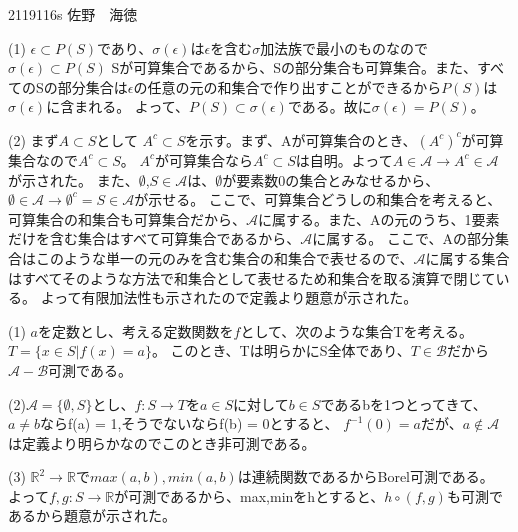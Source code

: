 \documentclass[11pt]{jsarticle}
\begin{document}
2119116s 佐野　海徳\\

\par (1) $\epsilon \subset P(S)$であり、$\sigma(\epsilon)$は$\epsilon$を含む$\sigma$加法族で最小のものなので$\sigma(\epsilon) \subset P(S)$
        Sが可算集合であるから、Sの部分集合も可算集合。また、すべてのSの部分集合は$\epsilon$の任意の元の和集合で作り出すことができるから$P(S)$は$\sigma(\epsilon)$に含まれる。
        よって、$P(S) \subset \sigma(\epsilon)$である。故に$\sigma(\epsilon) = P(S)$。
\par (2) まず$A \subset S$として $A^{c} \subset S$を示す。まず、Aが可算集合のとき、$(A^{c})^{c}$が可算集合なので$A^{c} \subset S$。
$A^c$が可算集合なら$A^c \subset S$は自明。よって$A \in \mathscr{A} \rightarrow A^c \in \mathscr{A}$が示された。
また、$\emptyset$,$S \in \mathscr{A}$は、$\emptyset$が要素数0の集合とみなせるから、$\emptyset \in \mathscr{A} \rightarrow \emptyset^{c} = S \in \mathscr{A}$が示せる。
ここで、可算集合どうしの和集合を考えると、可算集合の和集合も可算集合だから、$\mathscr{A}$に属する。また、Aの元のうち、1要素だけを含む集合はすべて可算集合であるから、$\mathscr{A}$に属する。
ここで、Aの部分集合はこのような単一の元のみを含む集合の和集合で表せるので、$\mathscr{A}$に属する集合はすべてそのような方法で和集合として表せるため和集合を取る演算で閉じている。
よって有限加法性も示されたので定義より題意が示された。\\

\par (1) $a$を定数とし、考える定数関数を$f$として、次のような集合Tを考える。
$T = \{x \in S | f(x) = a\}$。
このとき、Tは明らかにS全体であり、$T \in \mathscr{B}$だから$\mathscr{A} - \mathscr{B}$可測である。
\par (2)$\mathscr{A} = \{\emptyset,S\}$とし、$f:S \rightarrow T$を$a \in S$に対して$b\in S$であるbを1つとってきて、$a \neq b$ならf(a) = 1,そうでないならf(b) = 0とすると、
$f^{-1}(0) = a$だが、$a \notin \mathscr{A}$は定義より明らかなのでこのとき非可測である。
\par (3) $\mathbb{R}^2 \rightarrow \mathbb{R}$で$max(a,b),min(a,b)$は連続関数であるからBorel可測である。
よって$f,g:S \rightarrow \mathbb{R}$が可測であるから、max,minをhとすると、$h \circ (f,g)$も可測であるから題意が示された。\\
\\
\par
{}
\par
\end{document}
